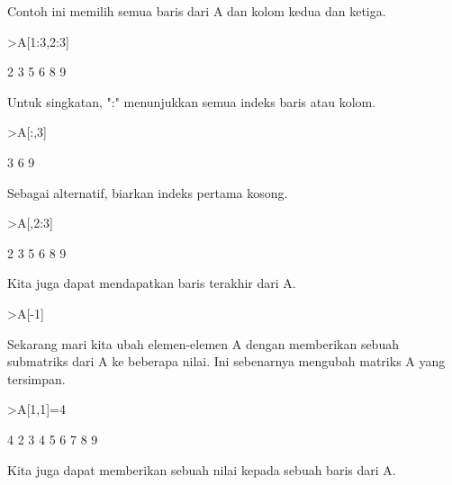 \documentclass[12pt,arial,letterpaper]{book}
\begin{document}
\begin{eulercomment}
\begin{eulercomment}
\begin{eulercomment}
\begin{eulercomment}
\begin{eulercomment}
\begin{eulercomment}
\begin{eulercomment}
\begin{eulercomment}
\begin{eulercomment}
Contoh ini memilih semua baris dari A dan kolom kedua dan ketiga.
\end{eulercomment}
\begin{eulerprompt}
>A[1:3,2:3]
\end{eulerprompt}
\begin{euleroutput}
              2             3 
              5             6 
              8             9 
\end{euleroutput}
\begin{eulercomment}
Untuk singkatan, ":" menunjukkan semua indeks baris atau kolom.
\end{eulercomment}
\begin{eulerprompt}
>A[:,3]
\end{eulerprompt}
\begin{euleroutput}
              3 
              6 
              9 
\end{euleroutput}
\begin{eulercomment}
Sebagai alternatif, biarkan indeks pertama kosong.
\end{eulercomment}
\begin{eulerprompt}
>A[,2:3]
\end{eulerprompt}
\begin{euleroutput}
              2             3 
              5             6 
              8             9 
\end{euleroutput}
\begin{eulercomment}
Kita juga dapat mendapatkan baris terakhir dari A.
\end{eulercomment}
\begin{eulerprompt}
>A[-1]
\end{eulerprompt}
\begin{euleroutput}
  [7,  8,  9]
\end{euleroutput}
\begin{eulercomment}
Sekarang mari kita ubah elemen-elemen A dengan memberikan sebuah
submatriks dari A ke beberapa nilai. Ini sebenarnya mengubah matriks A
yang tersimpan.
\end{eulercomment}
\begin{eulerprompt}
>A[1,1]=4
\end{eulerprompt}
\begin{euleroutput}
              4             2             3 
              4             5             6 
              7             8             9 
\end{euleroutput}
\begin{eulercomment}
Kita juga dapat memberikan sebuah nilai kepada sebuah baris dari A.

\end{eulercomment}
\end{eulercomment}
\end{eulercomment}
\end{eulercomment}
\end{eulercomment}
\end{eulercomment}
\end{eulercomment}
\end{eulercomment}
\end{eulercomment}
\end{document}
